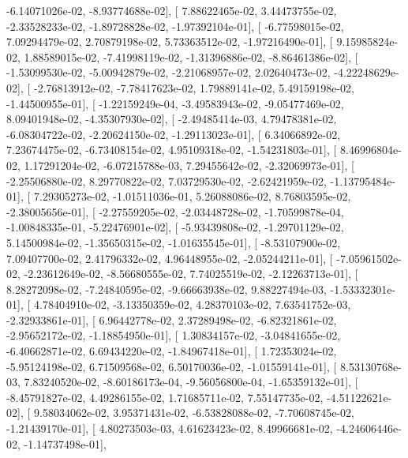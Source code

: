 \documentclass{article}
\begin{document}
         -6.14071026e-02,  -8.93774688e-02],
       [  7.88622465e-02,   3.44473755e-02,  -2.33528233e-02,
         -1.89728828e-02,  -1.97392104e-01],
       [ -6.77598015e-02,   7.09294479e-02,   2.70879198e-02,
          5.73363512e-02,  -1.97216490e-01],
       [  9.15985824e-02,   1.88589015e-02,  -7.41998119e-02,
         -1.31396886e-02,  -8.86461386e-02],
       [ -1.53099530e-02,  -5.00942879e-02,  -2.21068957e-02,
          2.02640473e-02,  -4.22248629e-02],
       [ -2.76813912e-02,  -7.78417623e-02,   1.79889141e-02,
          5.49159198e-02,  -1.44500955e-01],
       [ -1.22159249e-04,  -3.49583943e-02,  -9.05477469e-02,
          8.09401948e-02,  -4.35307930e-02],
       [ -2.49485414e-03,   4.79478381e-02,  -6.08304722e-02,
         -2.20624150e-02,  -1.29113023e-01],
       [  6.34066892e-02,   7.23674475e-02,  -6.73408154e-02,
          4.95109318e-02,  -1.54231803e-01],
       [  8.46996804e-02,   1.17291204e-02,  -6.07215788e-03,
          7.29455642e-02,  -2.32069973e-01],
       [ -2.25506880e-02,   8.29770822e-02,   7.03729530e-02,
         -2.62421959e-02,  -1.13795484e-01],
       [  7.29305273e-02,  -1.01511036e-01,   5.26088086e-02,
          8.76803595e-02,  -2.38005656e-01],
       [ -2.27559205e-02,  -2.03448728e-02,  -1.70599878e-04,
         -1.00848335e-01,  -5.22476901e-02],
       [ -5.93439808e-02,  -1.29701129e-02,   5.14500984e-02,
         -1.35650315e-02,  -1.01635545e-01],
       [ -8.53107900e-02,   7.09407700e-02,   2.41796332e-02,
          4.96448955e-02,  -2.05244211e-01],
       [ -7.05961502e-02,  -2.23612649e-02,  -8.56680555e-02,
          7.74025519e-02,  -2.12263713e-01],
       [  8.28272098e-02,  -7.24840595e-02,  -9.66663938e-02,
          9.88227494e-03,  -1.53332301e-01],
       [  4.78404910e-02,  -3.13350359e-02,   4.28370103e-02,
          7.63541752e-03,  -2.32933861e-01],
       [  6.96442778e-02,   2.37289498e-02,  -6.82321861e-02,
         -2.95652172e-02,  -1.18854950e-01],
       [  1.30834157e-02,  -3.04841655e-02,  -6.40662871e-02,
          6.69434220e-02,  -1.84967418e-01],
       [  1.72353024e-02,  -5.95124198e-02,   6.71509568e-02,
          6.50170036e-02,  -1.01559141e-01],
       [  8.53130768e-03,   7.83240520e-02,  -8.60186173e-04,
         -9.56056800e-04,  -1.65359132e-01],
       [ -8.45791827e-02,   4.49286155e-02,   1.71685711e-02,
          7.55147735e-02,  -4.51122621e-02],
       [  9.58034062e-02,   3.95371431e-02,  -6.53828088e-02,
         -7.70608745e-02,  -1.21439170e-01],
       [  4.80273503e-03,   4.61623423e-02,   8.49966681e-02,
         -4.24606446e-02,  -1.14737498e-01],
\end{document}
